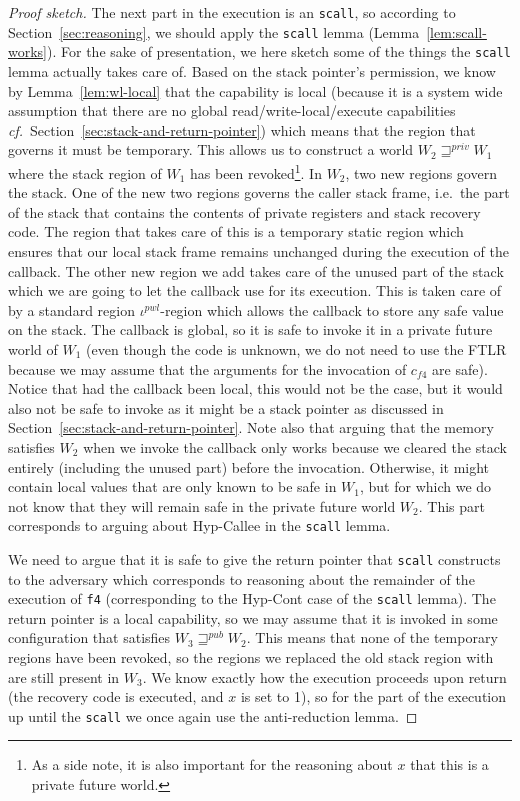 \documentclass[format=acmsmall, review=true, screen=true]{acmart}
\renewcommand{\sectionname}{Section}
\newcommand{\var}[1]{\mathit{#1}}
\newcommand{\futurewk}{\mathbin{\sqsupseteq}^{\var{pub}}}
\newcommand{\futurestr}{\mathbin{\sqsupseteq}^{\var{priv}}}
\newenvironment{toplas}%
    {\color{OliveGreen}}{}
\begin{document}
\begin{toplas}
\begin{proof}[Proof sketch]
  The next part in the execution is an \texttt{scall}, so according to \sectionname~\ref{sec:reasoning}, we should apply the \texttt{scall} lemma (Lemma~\ref{lem:scall-works}).
  For the sake of presentation, we here sketch some of the things the \texttt{scall} lemma actually takes care of.
  Based on the stack pointer's permission, we know by Lemma~\ref{lem:wl-local} that the capability is local (because it is a system wide assumption that there are no global read/write-local/execute capabilities \textit{cf.}\ \sectionname~\ref{sec:stack-and-return-pointer}) which means that the region that governs it must be temporary.
  This allows us to construct a world $W_2 \futurestr W_1$ where the stack region of $W_1$ has been revoked\footnote{As a side note, it is also important for the reasoning about $x$ that this is a private future world.}.
  In $W_2$, two new regions govern the stack.
  One of the new two regions governs the caller stack frame, i.e.\ the part of the stack that contains the contents of private registers and stack recovery code.
  The region that takes care of this is a temporary static region which ensures that our local stack frame remains unchanged during the execution of the callback.
  The other new region we add takes care of the unused part of the stack which we are going to let the callback use for its execution.
  This is taken care of by a standard region $\iota^{pwl}$-region which allows the callback to store any safe value on the stack.
  The callback is global, so it is safe to invoke it in a private future world of $W_1$ (even though the code is unknown, we do not need to use the FTLR because we may assume that the arguments for the invocation of $c_{f4}$ are safe).
  Notice that had the callback been local, this would not be the case, but it would also not be safe to invoke as it might be a stack pointer as discussed in \sectionname~\ref{sec:stack-and-return-pointer}.
  Note also that arguing that the memory satisfies $W_2$ when we invoke the callback only works because we cleared the stack entirely (including the unused part) before the invocation.
  Otherwise, it might contain local values that are only known to be safe in $W_1$, but for which we do not know that they will remain safe in the private future world $W_2$.
  This part corresponds to arguing about Hyp-Callee in the \texttt{scall} lemma.

  We need to argue that it is safe to give the return pointer that \texttt{scall} constructs to the adversary which corresponds to reasoning about the remainder of the execution of \texttt{f4} (corresponding to the Hyp-Cont case of the \texttt{scall} lemma).
  The return pointer is a local capability, so we may assume that it is invoked in some configuration that satisfies $W_3 \futurewk W_2$.
  This means that none of the temporary regions have been revoked, so the regions we replaced the old stack region with are still present in $W_3$.
  We know exactly how the execution proceeds upon return (the recovery code is executed, and $x$ is set to 1), so for the part of the execution up until the \texttt{scall} we once again use the anti-reduction lemma.
  

\end{proof}
\end{toplas}
\end{document}
